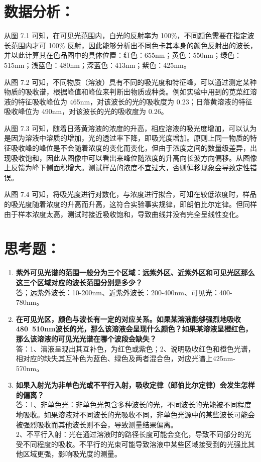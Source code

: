 \section{数据分析：}
从图 7.1 可知，在可见光范围内，白光的反射率为 100\%，不同颜色需要在指定波长范围内才可 100\% 反射，因此能够分析出不同色卡其本身的颜色反射出的波长，并以此计算其在色品图中的具体位置：红色：655nm；黄色：550nm；绿色：515nm；浅蓝色：480nm；深蓝色：413nm；紫色：425nm。

从图 7.2 可知，不同物质（溶液）具有不同的吸光度和特征峰，可以通过测定某种物质的吸收谱，根据峰值和峰位来判断出物质或种类。例如实验中用到的苋菜红溶液的特征吸收峰位为 465nm，对该波长的光的吸收度为 0.23；日落黄溶液的特征吸收峰位为 490nm，对该波长的光的吸收度为 0.26。

从图 7.3 可知，随着日落黄溶液的浓度的升高，相应溶液的吸光度增加，可以认为是因为溶液中溶质的增加，光的透过率下降，即吸光度增加。原则上同一物质的特征吸收峰的峰位是不会随着浓度的变化而变化，但由于浓度之间的数量级差异，出现吸收饱和，因此从图像中可以看出来峰位随浓度的升高向长波方向偏移。从图像上反馈为峰下侧面积增大。测试样品的浓度不宜过大，否则偏移现象会导致定性错误。

从图 7.4 可知，将吸光度进行对数化，与浓度进行拟合，可知在较低浓度时，样品的吸光度随着浓度的升高而升高，这符合实验事实规律，即朗伯比尔定律。但同样由于样本浓度太高，测试时接近吸收饱和，导致曲线并没有完全呈线性变化。

\section{思考题：}
\begin{enumerate}[label=\arabic* 、, leftmargin=4em, labelsep=0pt]
    \item \textbf{紫外可见光谱的范围一般分为三个区域：远紫外区、近紫外区和可见光区那么这三个区域对应的波长范围分别是多少？} \\
    答；远紫外波长：10-200nm、近紫外波长：200-400nm、可见光：400-780nm。
    
    \item \textbf{在可见光区，颜色与波长有一定的对应关系。如果某溶液能够强烈地吸收480~510nm波长的光，那么该溶液会呈现什么颜色？如果某溶液呈橙红色，那么该溶液的可见光光谱在哪个波段会缺失？} \\
    答：1、溶液呈现出其互补色，为红色或紫色；2、说明吸收红色和橙色光谱，相对应的缺失其互补色为蓝色、绿色及两者混合色，对应光谱上425nm-570nm。
    
    \item \textbf{如果入射光为非单色光或不平行入射，吸收定律（郎伯比尔定律）会发生怎样的偏离？} \\
    答：1、非单色光：非单色光包含多种波长的光，不同波长的光能被不同程度地吸收。如果溶液对不同波长的光吸收不同，非单色光源中的某些波长可能会被强烈吸收而其他波长则不会，导致测量结果偏离。\\
    2、不平行入射：光在通过溶液时的路径长度可能会变化，导致不同部分的光受不同程度的吸收。不平行的光束可能导致溶液中某些区域接受到的光强比其他区域更强，影响吸光度的测量。
\end{enumerate}